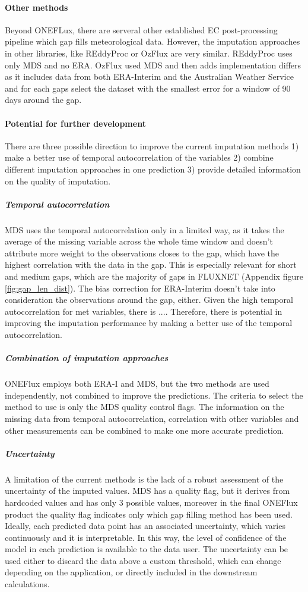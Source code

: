 \documentclass{article}
\begin{document}
\paragraph{Other methods} Beyond ONEFLux, there are serveral other established EC post-processing pipeline which gap fills meteorological data. However, the imputation approaches in other libraries, like REddyProc \cite{wutzler_basic_2018} or OzFlux \cite{isaac_ozflux_2017} are very similar. REddyProc uses only MDS and no ERA. OzFlux used MDS and then adds implementation differs as it includes data from both ERA-Interim and the Australian Weather Service and for each gaps select the dataset with the smallest error for a window of 90 days around the gap.
\pagebreak
\paragraph{Potential for further development} There are three possible direction to improve the current imputation methods  1) make a better use of temporal autocorrelation of the variables 2) combine different imputation approaches in one prediction  3) provide detailed information on the quality of imputation.

\subparagraph{Temporal autocorrelation} MDS uses the temporal autocorrelation only in a limited way, as it takes the average of the missing variable across the whole time window and doesn't attribute more weight to the observations closes to the gap, which have the highest correlation with the data in the gap. This is especially relevant for short and medium gaps, which are the majority of gaps in FLUXNET (Appendix figure \ref{fig:gap_len_dist}). The bias correction for ERA-Interim doesn't take into consideration the observations around the gap, either.  Given the high temporal autocorrelation for met variables, there is .... Therefore, there is potential in improving the imputation performance by making a better use of the temporal autocorrelation.

\subparagraph{Combination of imputation approaches} ONEFlux employs both ERA-I and MDS, but the two methods are used independently, not combined to improve the predictions. The criteria to select the method to use is only the MDS quality control flags. The information on the missing data from temporal autocorrelation, correlation with other variables and other measurements can be combined to make one more accurate prediction.

\subparagraph{Uncertainty} A limitation of the current methods is the lack of a robust assessment of the uncertainty of the imputed values. MDS has a quality flag, but it derives from hardcoded values and has only 3 possible values, moreover in the final ONEFlux product the quality flag indicates only which gap filling method has been used. Ideally, each predicted data point has an associated uncertainty, which varies continuously and it is interpretable. In this way, the level of confidence of the model in each prediction is available to the data user. The uncertainty can be used either to discard the data above a custom threshold, which can change depending on the application, or directly included in the downstream calculations.
\end{document}
